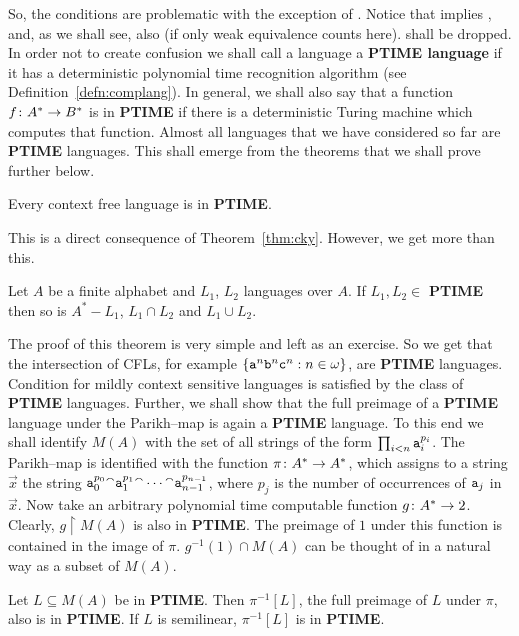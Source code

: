 So, the conditions are problematic with the exception of .
Notice that  implies , and, as we shall see, also 
 (if only weak equivalence counts here). 
shall be dropped. In order not to create confusion we shall call a 
language a \textbf{PTIME language} 
if it has a deterministic polynomial time recognition algorithm (see 
Definition~\ref{defn:complang}).
In general, we shall also say that a function
$f \colon A^{\ast} \rightarrow B^{\ast}$ is in \textbf{PTIME} if there is a
deterministic Turing machine which computes that function.
Almost all languages that we have considered so far are
\textbf{PTIME} languages. This shall emerge from the theorems
that we shall prove further below.
\begin{prop}
Every context free language is in \textbf{PTIME}.
\end{prop}
This is a direct consequence of Theorem~\ref{thm:cky}.
However, we get more than this.
\begin{prop}
\label{prop:schnitt}
Let $A$ be a finite alphabet and $L_1$, $L_2$ languages
over $A$. If $L_1, L_2 \in$ \textbf{PTIME} then so is
$A^{\ast} - L_1$, $L_1 \cap L_2$ and $L_1 \cup L_2$.
\end{prop}
The proof of this theorem is very simple and left as an
exercise. So we get that the intersection of CFLs,
for example $\{\mbox{\tt a}^n \mbox{\tt b}^n \mbox{\tt c}^n :
n \in \omega\}$, are \textbf{PTIME} languages. Condition  
for mildly context sensitive languages is satisfied by the class
of {\bf PTIME} languages. Further, we shall show that the
full preimage of a \textbf{PTIME} language under the Parikh--map
is again a \textbf{PTIME} language. To this end we shall
identify $M(A)$ with the set of all strings of the form
$\prod_{i < n} \mbox{\tt a}_i^{p_i}$.  The Parikh--map is
identified with the function $\pi \colon A^{\ast} \rightarrow A^{\ast}$,
which assigns to a string $\vec{x}$ the string
$\mbox{\tt a}_0^{p_0} {^{\smallfrown}} \mbox{\tt a}_1^{p_1} {^{\smallfrown}}
\dotsb {^{\smallfrown}} \mbox{\tt a}_{n-1}^{p_{n-1}}$, where
$p_j$ is the number of occurrences of $\mbox{\tt a}_j$ in
$\vec{x}$. Now take an arbitrary polynomial time computable
function $g \colon A^{\ast} \rightarrow 2$. Clearly, $g \restriction 
M(A)$ is also in {\bf PTIME}. The preimage of $1$ under this 
function is contained in the image of $\pi$. $g^{-1}(1) 
\cap M(A)$ can be thought of in a natural way as a subset of 
$M(A)$.
\begin{thm}
\label{thm:semi}
Let $L \subseteq M(A)$ be in \textbf{PTIME}. Then $\pi^{-1}[L]$, 
the full preimage of $L$ under $\pi$, also is in \textbf{PTIME}. If
$L$ is semilinear, $\pi^{-1}[L]$ is in \textbf{PTIME}.
\end{thm}
